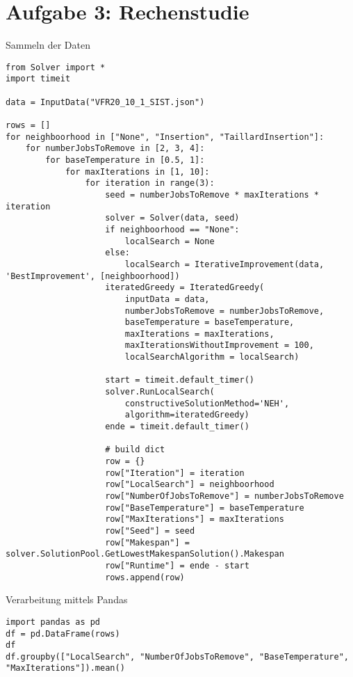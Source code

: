 \documentclass{article}
\begin{document}
	\section*{Aufgabe 3: Rechenstudie}
	Sammeln der Daten
	\begin{lstlisting}
from Solver import *
import timeit

data = InputData("VFR20_10_1_SIST.json") 

rows = []
for neighboorhood in ["None", "Insertion", "TaillardInsertion"]:
	for numberJobsToRemove in [2, 3, 4]:
		for baseTemperature in [0.5, 1]:
			for maxIterations in [1, 10]:
				for iteration in range(3):
					seed = numberJobsToRemove * maxIterations * iteration
					solver = Solver(data, seed)
					if neighboorhood == "None":
						localSearch = None
					else:
						localSearch = IterativeImprovement(data, 'BestImprovement', [neighboorhood])
					iteratedGreedy = IteratedGreedy(
						inputData = data, 
						numberJobsToRemove = numberJobsToRemove, 
						baseTemperature = baseTemperature, 
						maxIterations = maxIterations,
						maxIterationsWithoutImprovement = 100,
						localSearchAlgorithm = localSearch)

					start = timeit.default_timer()
					solver.RunLocalSearch(
						constructiveSolutionMethod='NEH',
						algorithm=iteratedGreedy)
					ende = timeit.default_timer()

					# build dict
					row = {}
					row["Iteration"] = iteration
					row["LocalSearch"] = neighboorhood
					row["NumberOfJobsToRemove"] = numberJobsToRemove
					row["BaseTemperature"] = baseTemperature
					row["MaxIterations"] = maxIterations
					row["Seed"] = seed
					row["Makespan"] = solver.SolutionPool.GetLowestMakespanSolution().Makespan
					row["Runtime"] = ende - start
					rows.append(row)
	\end{lstlisting}
	Verarbeitung mittels Pandas
	\begin{lstlisting}
import pandas as pd
df = pd.DataFrame(rows)
df
df.groupby(["LocalSearch", "NumberOfJobsToRemove", "BaseTemperature", "MaxIterations"]).mean()
	\end{lstlisting}
\end{document}
